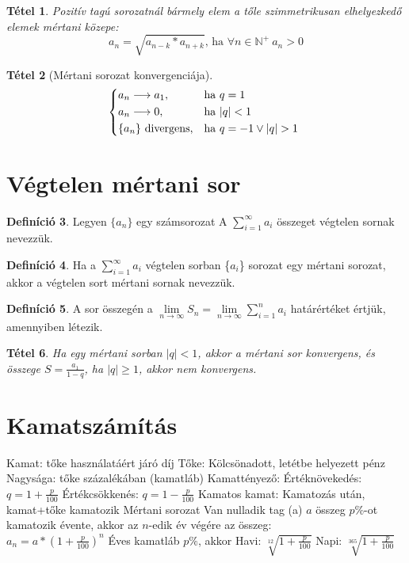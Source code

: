 \documentclass[twoside,12pt]{report}
\newtheorem{theorem}{Tétel}[section]
\theoremstyle{definition}
\newtheorem{definition}[theorem]{Definíció}
\begin{document}
	\begin{theorem}
		Pozitív tagú sorozatnál bármely elem a tőle szimmetrikusan elhelyezkedő elemek mértani
		közepe:
		\begin{equation*}
			a_n=\sqrt{a_{n-k}*a_{n+k}}\text{, ha }\forall n\in\mathbb{N}^+\ a_n>0
		\end{equation*}
	\end{theorem}
	\begin{theorem}[Mértani sorozat konvergenciája]
		\begin{equation*}
			\begin{cases*}
				a_n\longrightarrow a_1,& ha $q=1$\\
				a_n\longrightarrow 0,& ha $|q|<1$\\
				\{a_n\}\text{ divergens},& ha $q=-1\vee|q|>1$
			\end{cases*}
		\end{equation*}
	\end{theorem}
\section{Végtelen mértani sor}
	\begin{definition}
		Legyen $\{a_n\}$ egy számsorozat A $\sum_{i=1}^\infty a_i$ összeget végtelen sornak nevezzük.
	\end{definition}
	\begin{definition}
		Ha a $\sum_{i=1}^\infty a_i$ végtelen sorban \{$a_i$\} sorozat egy mértani sorozat, akkor a végtelen sort mértani sornak nevezzük.
	\end{definition}
	\begin{definition}
		A sor összegén a $\lim\limits_{n\to\infty} S_n=\lim\limits_{n\to\infty} \sum_{i=1}^n a_i$ határértéket értjük, amennyiben létezik.
	\end{definition}
	\begin{theorem}
		Ha egy mértani sorban $|q|<1$, akkor a mértani sor konvergens, és összege $S=\frac{a_1}{1-q}$, ha $|q|\ge1$, akkor nem konvergens.
	\end{theorem}
\section{Kamatszámítás}
	\begin{outline}
		\1 Kamat: tőke használatáért járó díj
			\2 Tőke: Kölcsönadott, letétbe helyezett pénz
			\2 Nagysága: tőke százalékában (kamatláb)
			\2 Kamattényező: 
				\3 Értéknövekedés: $q=1+\frac{p}{100}$
				\3 Értékcsökkenés: $q=1-\frac{p}{100}$
		\1 Kamatos kamat: Kamatozás után, kamat+tőke kamatozik
			\2 Mértani sorozat
				\3 Van nulladik tag (a)
			\2 $a$ összeg $p\%$-ot kamatozik évente, akkor az $n$-edik év végére az összeg:\\ $a_n=a*\left(1+\frac{p}{100}\right)^n$
			\2 Éves kamatláb $p\%$, akkor
				\3 Havi: $\sqrt[12]{1+\frac{p}{100}}$
				\3 Napi: $\sqrt[365]{1+\frac{p}{100}}$
	\end{outline}
\end{document}
